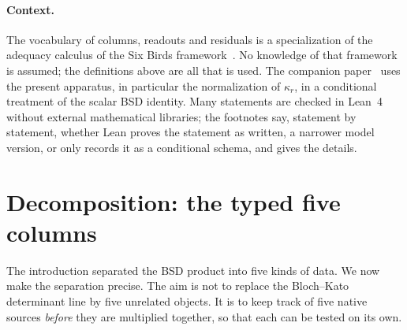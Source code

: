 \documentclass[11pt]{article}
\theoremstyle{definition}
\newcommand{\kapr}{\kappa_r}
\begin{document}
\paragraph{Context.}
The vocabulary of columns, readouts and residuals is a specialization of
the adequacy calculus of the Six Birds
framework~\citep{TsiokosNeedles2026,TsiokosFoundationsII2026,TsiokosFoundationsIII2026}.
No knowledge of that framework is assumed; the definitions above are all
that is used.  The companion paper~\citep{TsiokosBSDClosure2026} uses the
present apparatus, in particular the normalization of $\kapr$, in a
conditional treatment of the scalar BSD identity.  Many statements are
checked in Lean~4 without external mathematical libraries; the footnotes
say, statement by statement, whether Lean proves the statement as written,
a narrower model version, or only records it as a conditional schema, and
 gives the details.
 \section{Decomposition: the typed five columns}
\label{sec:decomposition}

The introduction separated the BSD product into five kinds of data.  We now
make the separation precise.  The aim is not to replace the Bloch--Kato
determinant line by five unrelated objects.  It is to keep track of five
native sources \emph{before} they are multiplied together, so that each can
be tested on its own.
\end{document}
